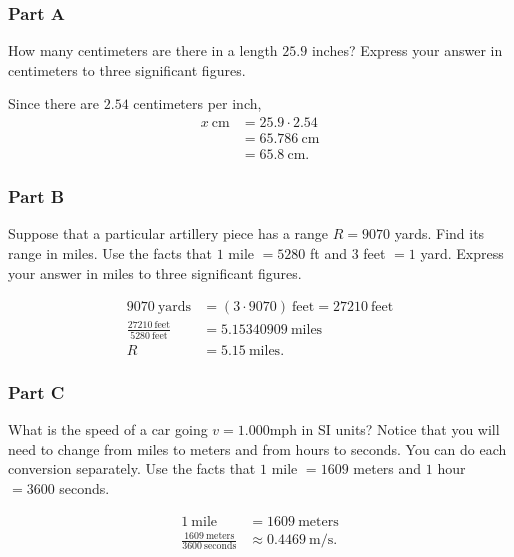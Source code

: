 \subsubsection{Part A}
How many centimeters are there in a length $25.9$ inches? Express your answer in centimeters to three significant figures.

\vspace{1em}

\begin{solution}
	Since there are $2.54$ centimeters per inch,
	\begin{align*}
		x~\text{cm} &= 25.9 \cdot 2.54 \\
		&= 65.786~\text{cm} \\
		&= 65.8~\text{cm}
		.\end{align*}
\end{solution}

\subsubsection{Part B}
Suppose that a particular artillery piece has a range $R=9070$ yards. Find its range in miles. Use the facts that $1$ mile $= 5280$ ft and $3$ feet $= 1$ yard. Express your answer in miles to three significant figures.

\vspace{1em}

\begin{solution}
	\begin{align*}
		9070~\text{yards} &= \left( 3 \cdot 9070 \right)~\text{feet} = 27210~\text{feet} \\
		\frac{27210~\text{feet}}{5280~\text{feet}} &= 5.15340909~\text{miles} \\
		R &= 5.15~\text{miles}
		.\end{align*}
\end{solution}

\subsubsection{Part C}
What is the speed of a car going $v=1.000$mph in SI units? Notice that you will need to change from miles to meters and from hours to seconds. You can do each conversion separately. Use the facts that $1$ mile $= 1609$ meters and $1$ hour $= 3600$ seconds.

\begin{solution}
	\begin{align*}
		1~\text{mile} &= 1609~ \text{meters} \\
		\frac{1609~\text{meters}}{3600~\text{seconds}} &\approx 0.4469~\text{m/s}
		.\end{align*}
\end{solution}

